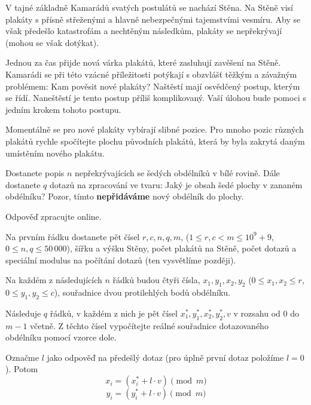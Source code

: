 
\usepackage[czech]{babel}





V tajné základně Kamarádů svatých postulátů se nachází Stěna. Na Stěně visí
plakáty s přísně střeženými a hlavně nebezpečnými tajemstvími vesmíru. Aby se
však předešlo katastrofám a nechtěným následkům, plakáty se nepřekrývají (mohou
se však dotýkat).

Jednou za čas přijde nová várka plakátů, které zasluhují zavěšení na Stěně.
Kamarádi se při této vzácné příležitosti potýkají s obzvlášť těžkým a závažným
problémem: Kam pověsit nové plakáty? Naštěstí mají osvědčený postup, kterým se
řídí. Naneštěstí je tento postup příliš komplikovaný. Vaší úlohou bude pomoci
s jedním krokem tohoto postupu.

Momentálně se pro nové plakáty vybírají slibné pozice. Pro mnoho pozic různých
plakátů rychle spočítejte plochu původních plakátů, která by byla zakrytá daným
umístěním nového plakátu.


Dostanete popis $n$ nepřekrývajících se šedých obdélníků v bílé rovině. Dále
dostanete $q$ dotazů na zpracování ve tvaru: Jaký je obsah šedé plochy
v zananém obdélníku? Pozor, tímto \textbf{nepřidáváme} nový obdélník do plochy.

Odpověď zpracujte online.


Na prvním řádku dostanete pět čísel $r, c, n, q, m$, ($1 \leq r, c < m \leq 10^9 + 9$, $0 \leq n,q \leq 50\,000$),
šířku a výšku Stěny, počet plakátů na Stěně, počet dotazů a speciální modulus na
počítání dotazů (ten vysvětlíme později).

Na každém z následujících $n$ řádků budou čtyři čísla, $x_1, y_1, x_2, y_2$ ($0 \leq x_1, x_2 \leq r$,
$0 \leq y_1, y_2 \leq c$), souřadnice dvou protilehlých bodů obdélníku.

Následuje $q$ řádků, v každém z nich je pět čísel $x_1^*, y_1^*, x_2^*, y_2^*, v$
v rozsahu od $0$ do $m - 1$ včetně. Z těchto čísel vypočítejte reálné souřadnice
dotazovaného obdélníku pomocí vzorce dole.

Označme $l$ jako odpověď na předešlý dotaz (pro úplně první dotaz položíme $l=0$). Potom
$$x_i = (x_i^* + l \cdot v) \pmod m$$
$$y_i = (y_i^* + l \cdot v) \pmod m$$

